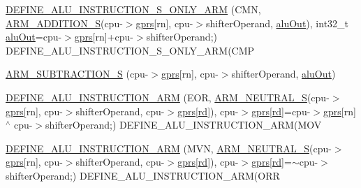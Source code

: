 \begin{DoxyCompactItemize}
\item 
\mbox{\hyperlink{isa-arm_8c_a8f02ed65b3e555e19b0323751d343a5b}{D\+E\+F\+I\+N\+E\+\_\+\+A\+L\+U\+\_\+\+I\+N\+S\+T\+R\+U\+C\+T\+I\+O\+N\+\_\+\+S\+\_\+\+O\+N\+L\+Y\+\_\+\+A\+RM}} (C\+MN, \mbox{\hyperlink{isa-arm_8c_a103147682143be92dabcad1fe5413934}{A\+R\+M\+\_\+\+A\+D\+D\+I\+T\+I\+O\+N\+\_\+S}}(cpu-\/$>$\mbox{\hyperlink{isa-thumb_8c_a6b4b7e13a9a144391615b217c5917bc7}{gprs}}\mbox{[}rn\mbox{]}, cpu-\/$>$shifter\+Operand, \mbox{\hyperlink{isa-arm_8c_abb37005c27e4a13f1e19fb44cb8288cb}{alu\+Out}}), int32\+\_\+t \mbox{\hyperlink{isa-arm_8c_abb37005c27e4a13f1e19fb44cb8288cb}{alu\+Out}}=cpu-\/$>$\mbox{\hyperlink{isa-thumb_8c_a6b4b7e13a9a144391615b217c5917bc7}{gprs}}\mbox{[}rn\mbox{]}+cpu-\/$>$shifter\+Operand;) D\+E\+F\+I\+N\+E\+\_\+\+A\+L\+U\+\_\+\+I\+N\+S\+T\+R\+U\+C\+T\+I\+O\+N\+\_\+\+S\+\_\+\+O\+N\+L\+Y\+\_\+\+A\+RM(C\+MP
\item 
\mbox{\hyperlink{isa-arm_8c_a2f9af7f16b68ab124d05941d4cfe3848}{A\+R\+M\+\_\+\+S\+U\+B\+T\+R\+A\+C\+T\+I\+O\+N\+\_\+S}} (cpu-\/$>$\mbox{\hyperlink{isa-thumb_8c_a6b4b7e13a9a144391615b217c5917bc7}{gprs}}\mbox{[}rn\mbox{]}, cpu-\/$>$shifter\+Operand, \mbox{\hyperlink{isa-arm_8c_abb37005c27e4a13f1e19fb44cb8288cb}{alu\+Out}})
\item 
\mbox{\hyperlink{isa-arm_8c_a3f4f463ea42e4b60531de2a33d42c561}{D\+E\+F\+I\+N\+E\+\_\+\+A\+L\+U\+\_\+\+I\+N\+S\+T\+R\+U\+C\+T\+I\+O\+N\+\_\+\+A\+RM}} (E\+OR, \mbox{\hyperlink{isa-arm_8c_ae0c54b99e326604c0849bad3030d8066}{A\+R\+M\+\_\+\+N\+E\+U\+T\+R\+A\+L\+\_\+S}}(cpu-\/$>$\mbox{\hyperlink{isa-thumb_8c_a6b4b7e13a9a144391615b217c5917bc7}{gprs}}\mbox{[}rn\mbox{]}, cpu-\/$>$shifter\+Operand, cpu-\/$>$\mbox{\hyperlink{isa-thumb_8c_a6b4b7e13a9a144391615b217c5917bc7}{gprs}}\mbox{[}\mbox{\hyperlink{isa-arm_8c_a555541ce18ed9b5fad657a06b22cb465}{rd}}\mbox{]}), cpu-\/$>$\mbox{\hyperlink{isa-thumb_8c_a6b4b7e13a9a144391615b217c5917bc7}{gprs}}\mbox{[}\mbox{\hyperlink{isa-arm_8c_a555541ce18ed9b5fad657a06b22cb465}{rd}}\mbox{]}=cpu-\/$>$\mbox{\hyperlink{isa-thumb_8c_a6b4b7e13a9a144391615b217c5917bc7}{gprs}}\mbox{[}rn\mbox{]} $^\wedge$ cpu-\/$>$shifter\+Operand;) D\+E\+F\+I\+N\+E\+\_\+\+A\+L\+U\+\_\+\+I\+N\+S\+T\+R\+U\+C\+T\+I\+O\+N\+\_\+\+A\+RM(M\+OV
\item 
\mbox{\hyperlink{isa-arm_8c_a23c55ee0706c2f9c5999a140273d48e0}{D\+E\+F\+I\+N\+E\+\_\+\+A\+L\+U\+\_\+\+I\+N\+S\+T\+R\+U\+C\+T\+I\+O\+N\+\_\+\+A\+RM}} (M\+VN, \mbox{\hyperlink{isa-arm_8c_ae0c54b99e326604c0849bad3030d8066}{A\+R\+M\+\_\+\+N\+E\+U\+T\+R\+A\+L\+\_\+S}}(cpu-\/$>$\mbox{\hyperlink{isa-thumb_8c_a6b4b7e13a9a144391615b217c5917bc7}{gprs}}\mbox{[}rn\mbox{]}, cpu-\/$>$shifter\+Operand, cpu-\/$>$\mbox{\hyperlink{isa-thumb_8c_a6b4b7e13a9a144391615b217c5917bc7}{gprs}}\mbox{[}\mbox{\hyperlink{isa-arm_8c_a555541ce18ed9b5fad657a06b22cb465}{rd}}\mbox{]}), cpu-\/$>$\mbox{\hyperlink{isa-thumb_8c_a6b4b7e13a9a144391615b217c5917bc7}{gprs}}\mbox{[}\mbox{\hyperlink{isa-arm_8c_a555541ce18ed9b5fad657a06b22cb465}{rd}}\mbox{]}=$\sim$cpu-\/$>$shifter\+Operand;) D\+E\+F\+I\+N\+E\+\_\+\+A\+L\+U\+\_\+\+I\+N\+S\+T\+R\+U\+C\+T\+I\+O\+N\+\_\+\+A\+RM(O\+RR

\end{DoxyCompactItemize}
